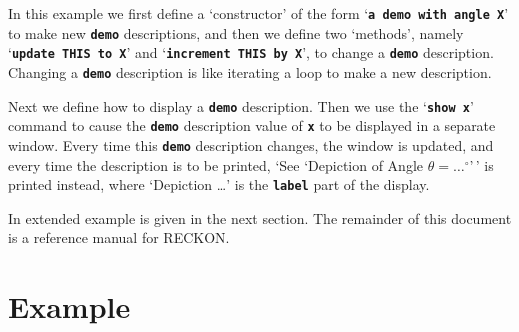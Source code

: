 \documentclass[12pt]{article}
\newcommand{\TT}[1]{{\tt \bfseries #1}}
\newlength{\figurewidth}
\newenvironment{boxedfigure}[1][!btp]%
	{\begin{figure*}[#1]
	 \begin{lrbox}{\figurebox}
	 \begin{minipage}{\figurewidth}

	 \vspace*{1ex}}%
	{
	 \vspace*{1ex}

	 \end{minipage}
	 \end{lrbox}
	 \begin{center}
	 \fbox{\hspace*{0.1in}\usebox{\figurebox}\hspace*{0.1in}}
	 \end{center}
	 \end{figure*}}
\begin{document}
In this example we first define a `constructor'
of the form `\TT{a demo with angle X}' to make new \TT{demo} descriptions,
and then we define two `methods', namely `\TT{update THIS to X}' and
`\TT{in\-cre\-ment THIS by X}', to change a \TT{demo} description.  Changing
a \TT{demo} description is like iterating a loop to make a new description.

Next we define how to display a \TT{demo} description.  Then we use the
`\TT{show x}' command
to cause the \TT{demo} description value of \TT{x}
to be displayed in a separate window.
Every time this \TT{demo} description
changes, the window is updated, and every time the description
is to be printed,
`See `Depiction of Angle $\theta=\ldots^\circ$'\,'
is printed instead, where `Depiction \ldots' is the \TT{label} part of
the display.

In extended example is given in the next section.
The remainder of this document is a reference manual for RECKON.

\section{Example}


\end{document}
